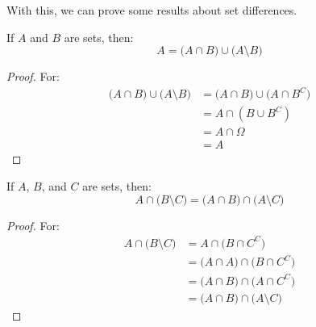 \documentclass[crop=false,class=book,oneside]{standalone}
\begin{document}
            With this, we can prove some results about set differences.
            \begin{theorem}
                If $A$ and $B$ are sets, then:
                \begin{equation}
                    A=\big(A\cap{B}\big)\cup\big(A\setminus{B}\big)
                \end{equation}
            \end{theorem}
            \begin{proof}
                For:
                \begin{subequations}
                    \begin{align}
                        \big(A\cap{B})\cup\big(A\setminus{B}\big)
                        &=\big(A\cap{B}\big)\cup\big(A\cap{B}^{C}\big)\\
                        &=A\cap(B\cup{B}^{C})\\
                        &=A\cap\Omega\\
                        &=A
                    \end{align}
                \end{subequations}
            \end{proof}
            \begin{theorem}
                If $A$, $B$, and $C$ are sets, then:
                \begin{equation}
                    A\cap\big(B\setminus{C}\big)
                    =\big(A\cap{B}\big)\cap\big(A\setminus{C}\big)
                \end{equation}
            \end{theorem}
            \begin{proof}
                For:
                \begin{subequations}
                    \begin{align}
                        A\cap\big(B\setminus{C}\big)
                        &=A\cap\big(B\cap{C}^{C}\big)\\
                        &=\big(A\cap{A}\big)\cap\big(B\cap{C}^{C}\big)\\
                        &=\big(A\cap{B}\big)\cap\big(A\cap{C}^{C}\big)\\
                        &=\big(A\cap{B}\big)\cap\big(A\setminus{C}\big)
                    \end{align}
                \end{subequations}
            \end{proof}
\end{document}
